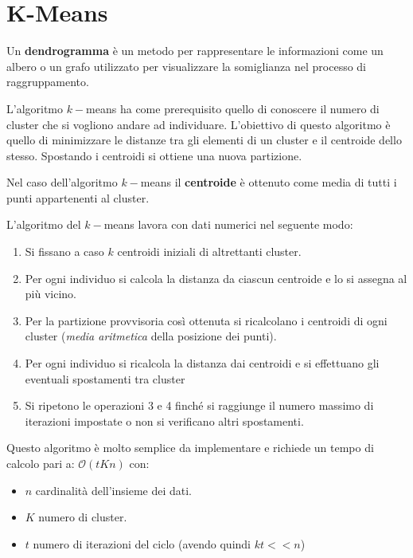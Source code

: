 \section{K-Means}
\begin{definizione}
    Un \textbf{dendrogramma} è un metodo per rappresentare le informazioni come
    un albero o un grafo utilizzato per visualizzare la somiglianza nel processo
    di raggruppamento.
\end{definizione}
L'algoritmo $k-$means ha come prerequisito quello di conoscere il numero di cluster
che si vogliono andare ad individuare. L'obiettivo di questo algoritmo è quello
di minimizzare le distanze tra gli elementi di un cluster e il centroide dello stesso.
Spostando i centroidi si ottiene una nuova partizione.
\begin{definizione}
    Nel caso dell'algoritmo $k-$means il \textbf{centroide} è ottenuto come media
    di tutti i punti appartenenti al cluster.
\end{definizione}
L'algoritmo del $k-$means lavora con dati numerici nel seguente modo:
\begin{enumerate}
    \item Si fissano a caso $k$ centroidi iniziali di altrettanti cluster.
    \item Per ogni individuo si calcola la distanza da ciascun centroide e lo si
          assegna al più vicino.
    \item Per la partizione provvisoria così ottenuta si ricalcolano i centroidi
          di ogni cluster (\textit{media aritmetica} della posizione dei punti).
    \item Per ogni individuo si ricalcola la distanza dai centroidi e si effettuano
          gli eventuali spostamenti tra cluster
    \item Si ripetono le operazioni 3 e 4 finché si raggiunge il numero massimo
          di iterazioni impostate o non si verificano altri spostamenti.
\end{enumerate}
Questo algoritmo è molto semplice da implementare e richiede un tempo di calcolo
pari a: $\mathcal{O}(tKn)$ con:
\begin{itemize}
    \item $n$ cardinalità dell'insieme dei dati.
    \item $K$ numero di cluster.
    \item $t$ numero di iterazioni del ciclo (avendo quindi $kt << n$)
\end{itemize}

